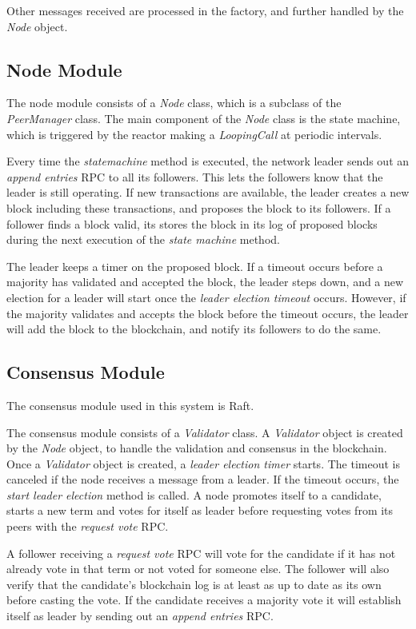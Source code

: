 Other messages received are processed in the factory, and further handled by the \textit{Node} object.


\subsection{Node Module}
The node module consists of a \textit{Node} class, which is a subclass of the \textit{PeerManager} class. The main component of the \textit{Node} class is the state machine, which is triggered by the reactor making a \textit{LoopingCall} at periodic intervals. 

Every time the \textit{state\textunderscore machine} method is executed, the network leader sends out an \textit{append entries} RPC to all its followers. This lets the followers know that the leader is still operating. If new transactions are available, the leader creates a new block including these transactions, and proposes the block to its followers. If a follower finds a block valid, its stores the block in its log of proposed blocks during the next execution of the \textit{state machine} method. 

The leader keeps a timer on the proposed block. If a timeout occurs before a majority has validated and accepted the block, the leader steps down, and a new election for a leader will start once the \textit{leader election timeout} occurs. However, if the majority validates and accepts the block before the timeout occurs, the leader will add the block to the blockchain, and notify its followers to do the same. 

\subsection{Consensus Module}
The consensus module used in this system is Raft. 

The consensus module consists of a \textit{Validator} class. A \textit{Validator} object is created by the \textit{Node} object, to handle the validation and consensus in the blockchain. Once a \textit{Validator} object is created, a \textit{leader election timer} starts. The timeout is canceled if the node receives a message from a leader. If the timeout occurs, the \textit{start leader election} method is called. A node promotes itself to a candidate, starts a new term and votes for itself as leader before requesting votes from its peers with the \textit{request vote} RPC. 

A follower receiving a \textit{request vote} RPC will vote for the candidate if it has not already vote in that term or not voted for someone else. The follower will also verify that the candidate's blockchain log is at least as up to date as its own before casting the vote. If the candidate receives a majority vote it will establish itself as leader by sending out an \textit{append entries} RPC. 

